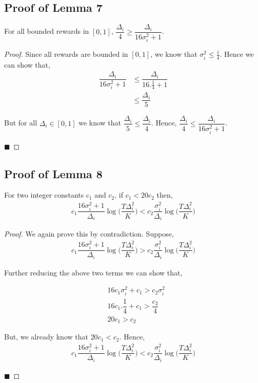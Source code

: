 \subsection{Proof of Lemma 7}
\label{App:Lemma:7}
\begin{lemma}
For all bounded rewards in $[0,1]$, $\dfrac{\Delta_i}{4} \geq \dfrac{\Delta_i}{16\sigma_i^2 + 1} $.
\end{lemma}

\begin{proof}
Since all rewards are bounded in $[0,1]$, we know that $\sigma_i^2 \leq \frac{1}{4}$. Hence we can show that,
\begin{align*}
\dfrac{\Delta_i}{16\sigma_i^2 + 1} &\leq \dfrac{\Delta_i}{16.\frac{1}{4} + 1}\\
& \leq \dfrac{\Delta_i}{5}
\end{align*}
 
But for all $\Delta_i \in [0,1]$ we know that $\dfrac{\Delta_{i}}{5} \leq \dfrac{\Delta_{i}}{4} $. Hence, 
$\dfrac{\Delta_i}{4} \leq \dfrac{\Delta_i}{16\sigma_i^2 + 1} $.

\hfill $\blacksquare$	
\end{proof}



\subsection{Proof of Lemma 8}
\label{App:Lemma:8}
\begin{lemma}
For two integer constants $c_1$ and $c_2$, if $c_1 < 20 c_2$ then,
\begin{align*}
c_1 \dfrac{16\sigma_i^2 + 1}{\Delta_i}\log\bigg( \dfrac{T\Delta_i^2}{K}\bigg) < c_2 \dfrac{\sigma_i^2}{\Delta_i}\log\bigg( \dfrac{T\Delta_i^2}{K}\bigg)
\end{align*}
 
\end{lemma}

\begin{proof}
We again prove this by contradiction. Suppose, 
\begin{align*}
c_1 \dfrac{16\sigma_i^2 + 1}{\Delta_i}\log\bigg( \dfrac{T\Delta_i^2}{K}\bigg) > c_2 \dfrac{\sigma_i^2}{\Delta_i}\log\bigg( \dfrac{T\Delta_i^2}{K}\bigg)
\end{align*}

Further reducing the above two terms we can show that, 

\begin{align*}
& 16c_1\sigma_i^2 + c_1 > c_2\sigma_i^2\\
& 16c_1.\dfrac{1}{4} + c_1 > \dfrac{c_2}{4}\\
& 20 c_1 > c_2
\end{align*}

But, we already know that $20 c_1 < c_2$. Hence, 
\begin{align*}
c_1 \dfrac{16\sigma_i^2 + 1}{\Delta_i}\log\bigg( \dfrac{T\Delta_i^2}{K}\bigg) < c_2 \dfrac{\sigma_i^2}{\Delta_i}\log\bigg( \dfrac{T\Delta_i^2}{K}\bigg)
\end{align*}

\hfill $\blacksquare$	
\end{proof}


